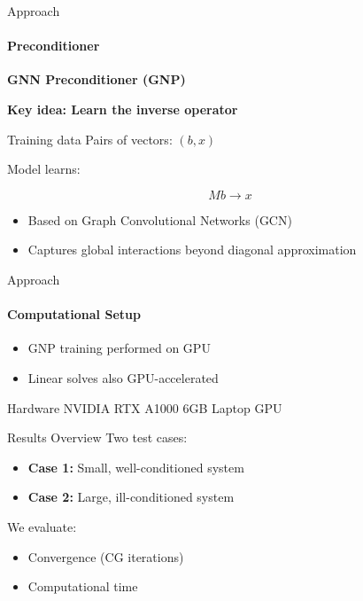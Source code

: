 \documentclass[aspectratio=169]{beamer}
\begin{document}

\begin{frame}{Approach}
		\framesubtitle{Preconditioner}
	\textbf{GNN Preconditioner (GNP) \cite{Chen_2024}}
	
	\medskip
	
	\textbf{Key idea: Learn the inverse operator}
	
	\medskip
	
	\begin{block}{Training data}
		Pairs of vectors: $(b, x)$ 
	\end{block}
	
	\medskip
	
	Model learns:
	
	\[
	Mb \rightarrow x
	\]
	
	\medskip
	
	\begin{itemize}
		\item Based on Graph Convolutional Networks (GCN)
		\item Captures global interactions beyond diagonal approximation
	\end{itemize}
	

\end{frame}



\begin{frame}{Approach}
	\framesubtitle{Computational Setup}

	\begin{itemize}
		\item GNP training performed on GPU
		\item Linear solves also GPU-accelerated
	\end{itemize}
	
	\medskip
	
	\begin{block}{Hardware}
		NVIDIA RTX A1000 6GB Laptop GPU
	\end{block}
	

\end{frame}


\begin{frame}{Results Overview}
	Two test cases:
	
	\begin{itemize}
		\item \textbf{Case 1:} Small, well-conditioned system
		\item \textbf{Case 2:} Large, ill-conditioned system
	\end{itemize}
	
	\medskip
	
	We evaluate:
	
	\begin{itemize}
		\item Convergence (CG iterations)
		\item Computational time
	\end{itemize}
	

\end{frame}
\end{document}
